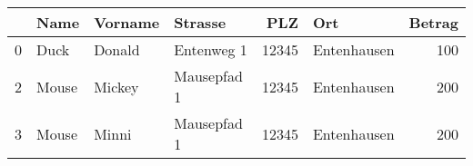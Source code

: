 \begin{tabular}{llllrlr}
\toprule
{} &   Name & Vorname &      Strasse &    PLZ &          Ort &  Betrag \\
\midrule
0 &   Duck &  Donald &   Entenweg 1 &  12345 &  Entenhausen &     100 \\
2 &  Mouse &  Mickey &  Mausepfad 1 &  12345 &  Entenhausen &     200 \\
3 &  Mouse &   Minni &  Mausepfad 1 &  12345 &  Entenhausen &     200 \\
\bottomrule
\end{tabular}
